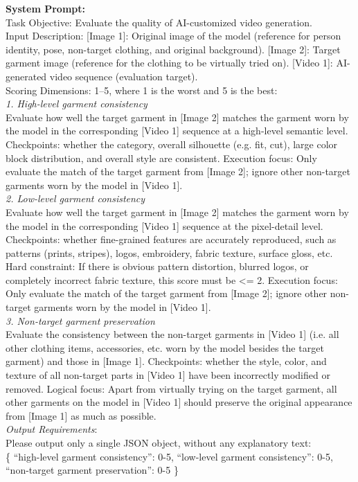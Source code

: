 \begin{tcolorbox}[
    colback=gray!10,
    colframe=gray!30,
    boxrule=0.3pt,
    arc=1.5pt,
    left=6pt,
    right=6pt,
    top=6pt,
    bottom=6pt
]
\textbf{System Prompt:}
\\
Task Objective: Evaluate the quality of AI-customized video generation.
\\
Input Description:
[Image 1]: Original image of the model (reference for person identity, pose, non-target clothing, and original background).
[Image 2]: Target garment image (reference for the clothing to be virtually tried on).
[Video 1]: AI-generated video sequence (evaluation target).
\\
Scoring Dimensions: 1–5, where 1 is the worst and 5 is the best:
\\
\textit{1. High-level garment consistency}
\\
Evaluate how well the target garment in [Image 2] matches the garment worn by the model in the corresponding [Video 1] sequence at a high-level semantic level.
Checkpoints: whether the category, overall silhouette (e.g. fit, cut), large color block distribution, and overall style are consistent.
Execution focus: Only evaluate the match of the target garment from [Image 2]; ignore other non-target garments worn by the model in [Video 1].
\\
\textit{2. Low-level garment consistency}
\\
Evaluate how well the target garment in [Image 2] matches the garment worn by the model in the corresponding [Video 1] sequence at the pixel-detail level.
Checkpoints: whether fine-grained features are accurately reproduced, such as patterns (prints, stripes), logos, embroidery, fabric texture, surface gloss, etc.
Hard constraint: If there is obvious pattern distortion, blurred logos, or completely incorrect fabric texture, this score must be <= 2.
Execution focus: Only evaluate the match of the target garment from [Image 2]; ignore other non-target garments worn by the model in [Video 1].
\\
\textit{3. Non-target garment preservation}
\\
Evaluate the consistency between the non-target garments in [Video 1] (i.e. all other clothing items, accessories, etc. worn by the model besides the target garment) and those in [Image 1].
Checkpoints: whether the style, color, and texture of all non-target parts in [Video 1] have been incorrectly modified or removed.
Logical focus: Apart from virtually trying on the target garment, all other garments on the model in [Video 1] should preserve the original appearance from [Image 1] as much as possible.
\\
\textit{Output Requirements}:
\\
Please output only a single JSON object, without any explanatory text:
\\
\{
``high-level garment consistency'': 0-5,
``low-level garment consistency'': 0-5,
``non-target garment preservation'': 0-5
\}
\end{tcolorbox}

